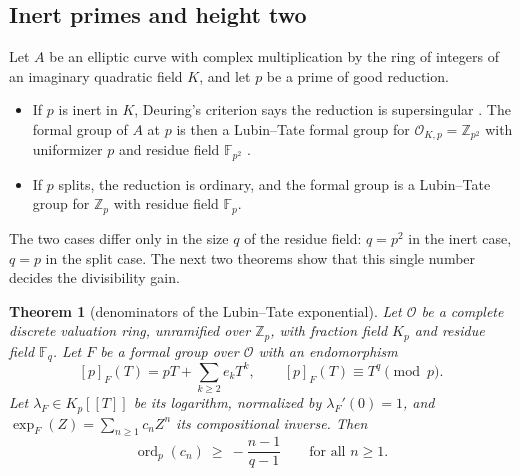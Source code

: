 \documentclass[11pt]{amsart}
\newtheorem{theorem}{Theorem}[section]
\theoremstyle{definition}
\theoremstyle{remark}
\DeclareMathOperator{\ord}{ord}
\newcommand{\Z}{\mathbb{Z}}
\newcommand{\F}{\mathbb{F}}
\begin{document}
\subsection{Inert primes and height two}\label{subsec:height}
Let $A$ be an elliptic curve with complex multiplication by the ring of integers of an imaginary quadratic field $K$, and let $p$ be a prime of good reduction.
\begin{itemize}
\item If $p$ is inert in $K$, Deuring's criterion says the reduction is supersingular \cite[Ch.~13]{Lang-EF}. The formal group of $A$ at $p$ is then a Lubin--Tate formal group for $\mathcal O_{K,p}=\Z_{p^2}$ with uniformizer $p$ and residue field $\F_{p^2}$ \cite{Lubin-Tate}.
\item If $p$ splits, the reduction is ordinary, and the formal group is a Lubin--Tate group for $\Z_p$ with residue field $\F_p$.
\end{itemize}
The two cases differ only in the size $q$ of the residue field: $q=p^2$ in the inert case, $q=p$ in the split case. The next two theorems show that this single number decides the divisibility gain.

\begin{theorem}[denominators of the Lubin--Tate exponential]\label{thm:LT-exp}
Let $\mathcal O$ be a complete discrete valuation ring, unramified over $\Z_p$, with fraction field $K_p$ and residue field $\F_q$. Let $F$ be a formal group over $\mathcal O$ with an endomorphism
\[
[p]_F(T)=pT+\sum_{k\ge2}e_kT^k,\qquad [p]_F(T)\equiv T^q\pmod p .
\]
Let $\lambda_F\in K_p[[T]]$ be its logarithm, normalized by $\lambda_F'(0)=1$, and $\exp_F(Z)=\sum_{n\ge1}c_nZ^n$ its compositional inverse. Then
\[
\ord_p(c_n)\ \ge\ -\frac{n-1}{q-1}\qquad\text{for all }n\ge1 .
\]
\end{theorem}
\end{document}
